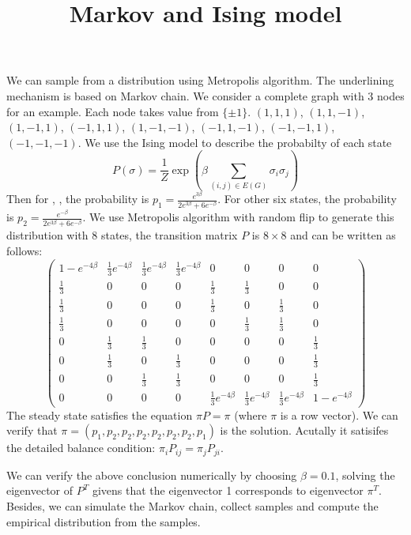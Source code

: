 \documentclass{article}
\title{Markov and Ising model}
\begin{document}
\maketitle
We can sample from a distribution using Metropolis algorithm. The underlining mechanism is
based on Markov chain. We consider a complete graph with 3 nodes for an example.
Each node takes value from $\{\pm 1\}$.
 $(1,1,1)$,
 $(1,1,-1)$, $(1,-1,1)$, $(-1,1,1)$,
 $(1,-1,-1)$, $(-1,1,-1)$, $(-1,-1,1)$,
 $(-1,-1,-1)$.
We use the Ising model to describe the probabilty of each state
$$
P(\sigma) = \frac{1}{Z} \exp(\beta \sum_{(i,j) \in E(G)} \sigma_i \sigma_j)
$$
Then for , , the probability is
$p_1 = \frac{e^{3\beta}}{2e^{3\beta} + 6 e^{-\beta}}$.
For other six states, the probability is 
$p_2 = \frac{e^{-\beta}}{2e^{3\beta} + 6 e^{-\beta}}$.
We use Metropolis algorithm with random flip to generate this distribution with 8 states,
the transition matrix $P$ is  $8\times 8$ and can be written as follows:
$$
\begin{pmatrix}
1-e^{-4\beta} & \frac{1}{3} e^{-4\beta} & \frac{1}{3} e^{-4\beta} & \frac{1}{3} e^{-4\beta} & 0 & 0 & 0 & 0 \\
\frac{1}{3} & 0 & 0 & 0 & \frac{1}{3} & \frac{1}{3} & 0 & 0 \\
\frac{1}{3}& 0 & 0 & 0 & \frac{1}{3} & 0 & \frac{1}{3} & 0 \\
\frac{1}{3} & 0 & 0 & 0 & 0 & \frac{1}{3} & \frac{1}{3} & 0 \\
0 & \frac{1}{3} & \frac{1}{3} & 0 & 0 & 0 & 0 & \frac{1}{3} \\
0 & \frac{1}{3} & 0 & \frac{1}{3} & 0 & 0 & 0 & \frac{1}{3} \\
0 & 0 & \frac{1}{3} & \frac{1}{3} & 0 & 0 & 0 & \frac{1}{3} \\
0 & 0 & 0 & 0 &  \frac{1}{3} e^{-4\beta} & \frac{1}{3} e^{-4\beta} & \frac{1}{3} e^{-4\beta} & 1-e^{-4\beta}
\end{pmatrix}
$$
The steady state satisfies the equation $\pi P = \pi$ (where $\pi$ is a row vector).
We can verify that $\pi = (p_1, p_2, p_2, p_2, p_2, p_2, p_2, p_1)$ is the solution.
Acutally it satisifes the detailed balance condition: $\pi_i P_{ij} = \pi_j P_{ji}$.

We can verify the above conclusion numerically by choosing $\beta = 0.1$, solving
the eigenvector of $P^T$ givens that the eigenvector 1 corresponds to eigenvector $\pi^T$.
Besides, we can simulate the Markov chain, collect samples and compute
the empirical distribution from the samples.
\end{document}
